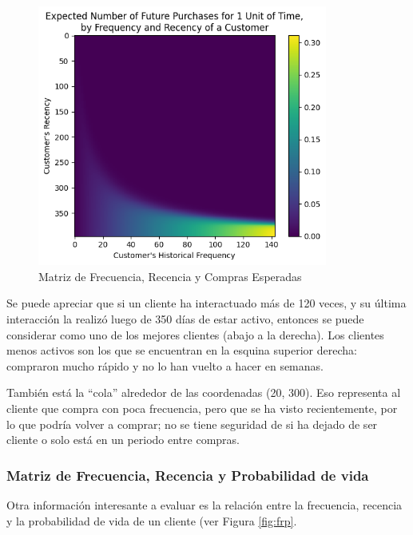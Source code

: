 \begin{figure}[H]
	\centering \includegraphics[width=0.85\textwidth]{images/matriz-f-r.png}
	\caption{Matriz de Frecuencia, Recencia y Compras Esperadas}
	\label{fig:frc}
\end{figure}

\vspace{-5.5mm}

	Se puede apreciar que si un cliente ha interactuado más de 120 veces, y su última interacción la realizó luego de 350 días de estar activo, entonces se puede considerar como uno de los mejores clientes (abajo a la derecha). Los clientes menos activos son los que se encuentran en la esquina superior derecha: compraron mucho rápido y no lo han vuelto a hacer en semanas.

	También está la “cola” alrededor de las coordenadas (20, 300). Eso representa al cliente que compra con poca frecuencia, pero que se ha visto recientemente, por lo que podría volver a comprar; no se tiene seguridad de si ha dejado de ser cliente o solo está en un periodo entre compras.
	
\subsubsection{Matriz de Frecuencia, Recencia y Probabilidad de vida}

Otra información interesante a evaluar es la relación entre la frecuencia, recencia y la probabilidad de vida de un cliente (ver Figura \ref{fig:frp}.

